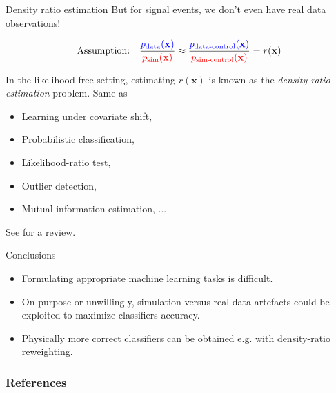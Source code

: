 \documentclass{beamer}
\begin{document}

\begin{frame}{Density ratio estimation}
But for signal events, we don't even have real data observations!

$$\text{Assumption:}\quad \frac{\color{blue} p_\text{data}(\mathbf{x})}{\color{red} p_\text{sim}(\mathbf{x})} \approx \frac{\color{blue} p_\text{data-control}(\mathbf{x})}{\color{red} p_\text{sim-control}(\mathbf{x})} = r(\mathbf{x}) $$

\vspace{1cm}

In the likelihood-free setting, estimating $r(\mathbf{x})$ is known as the {\it
density-ratio estimation} problem. Same as
\begin{itemize}
    \item Learning under covariate shift,
    \item Probabilistic classification,
    \item Likelihood-ratio test,
    \item Outlier detection,
    \item Mutual information estimation, ...
\end{itemize}
See \cite{sugiyama2012density} for a review.
\end{frame}


\begin{frame}{Conclusions}

\begin{itemize}
    \item Formulating appropriate machine learning tasks is {\color{red} difficult}.

    \vspace{0.5cm}

    \item On purpose or {\color{red} unwillingly}, simulation versus real data artefacts
          could be exploited to maximize classifiers accuracy.

    \vspace{0.5cm}

    \item Physically more correct classifiers can be obtained e.g. with {\color{blue} density-ratio reweighting}.
\end{itemize}

\end{frame}


\begin{frame}
    \frametitle{References}
    {\footnotesize
    
    }
\end{frame}
\end{document}
